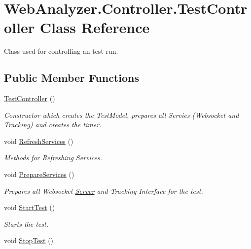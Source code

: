 \hypertarget{class_web_analyzer_1_1_controller_1_1_test_controller}{}\section{Web\+Analyzer.\+Controller.\+Test\+Controller Class Reference}
\label{class_web_analyzer_1_1_controller_1_1_test_controller}


Class used for controlling an test run.  


\subsection*{Public Member Functions}
\begin{DoxyCompactItemize}
\item 
\hyperlink{class_web_analyzer_1_1_controller_1_1_test_controller_acac996dad8f9c1f9890263f82df9593a}{Test\+Controller} ()
\begin{DoxyCompactList}\small\item\em Constructor which creates the Test\+Model, prepares all Servies (Websocket and Tracking) and creates the timer. \end{DoxyCompactList}\item 
void \hyperlink{class_web_analyzer_1_1_controller_1_1_test_controller_a7074ca580c48782cb944d4cde6bbe26e}{Refresh\+Services} ()
\begin{DoxyCompactList}\small\item\em Methods for Refreshing Services. \end{DoxyCompactList}\item 
void \hyperlink{class_web_analyzer_1_1_controller_1_1_test_controller_afe606c22838435b0b471cea3157a1a3e}{Prepare\+Services} ()
\begin{DoxyCompactList}\small\item\em Prepares all Websocket \hyperlink{namespace_web_analyzer_1_1_server}{Server} and Tracking Interface for the test. \end{DoxyCompactList}\item 
void \hyperlink{class_web_analyzer_1_1_controller_1_1_test_controller_a2c41ced530712abfceaab3cea7f6bbac}{Start\+Test} ()
\begin{DoxyCompactList}\small\item\em Starts the test. \end{DoxyCompactList}\item 
void \hyperlink{class_web_analyzer_1_1_controller_1_1_test_controller_a6ebdcf138dc6c394c8a5695da1f8de23}{Stop\+Test} ()

\end{DoxyCompactItemize}
